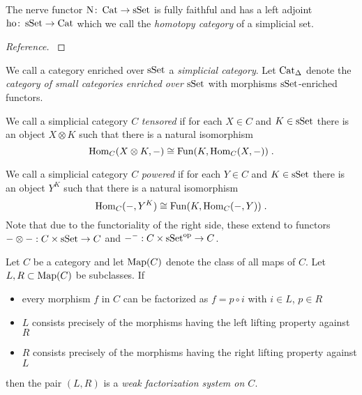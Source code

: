 \begin{lemma}
    The nerve functor $\operatorname{N}\colon\operatorname{Cat}\to\operatorname{sSet}$ is fully faithful and has a left adjoint $\operatorname{ho}\colon\operatorname{sSet}\to\operatorname{Cat}$ which we call the \emph{homotopy category} of a simplicial set.
    \begin{proof}[Reference]
        \cite[Proposition 1.2.2.1]{kerodon}
    \end{proof}
\end{lemma}
\begin{definition}
    We call a category enriched over $\operatorname{sSet}$ a \emph{simplicial category}.
    Let $\operatorname{Cat}_{\Delta}$ denote the \emph{category of small categories enriched over $\operatorname{sSet}$} with morphisms $\operatorname{sSet}$-enriched functors.
    
    We call a simplicial category $C$ \emph{tensored} if for each $X\in C$ and $K\in\operatorname{sSet}$ there is an object $X\otimes K$ such that there is a natural isomorphism
    \begin{equation*}
        \operatorname{Hom}_C(X\otimes K,-)\cong\operatorname{Fun}(K,\operatorname{Hom}_C(X,-))\;.
    \end{equation*}

    We call a simplicial category $C$ \emph{powered} if for each $Y\in C$ and $K\in\operatorname{sSet}$ there is an object $Y^K$ such that there is a natural isomorphism
    \begin{equation*}
        \operatorname{Hom}_C(-,Y^K)\cong\operatorname{Fun}(K,\operatorname{Hom}_C(-,Y))\;.
    \end{equation*}
    Note that due to the functoriality of the right side, these extend to functors $-\otimes -:C\times\operatorname{sSet}\to C$ and $-^-:C\times\operatorname{sSet}^{\operatorname{op}}\to C$.
\end{definition}
\begin{definition}
    Let $C$ be a category and let $\operatorname{Map}(C)$ denote the class of all maps of $C$.
    Let $L,R\subset\operatorname{Map}(C)$ be subclasses.
    If 
    \begin{itemize}
        \item every morphism $f$ in $C$ can be factorized as $f=p\circ i$ with $i\in L$, $p\in R$
        \item $L$ consists precisely of the morphisms having the left lifting property against $R$
        \item $R$ consists precisely of the morphisms having the right lifting property against $L$
    \end{itemize}
    then the pair $(L,R)$ is a \emph{weak factorization system on $C$}.
\end{definition}
